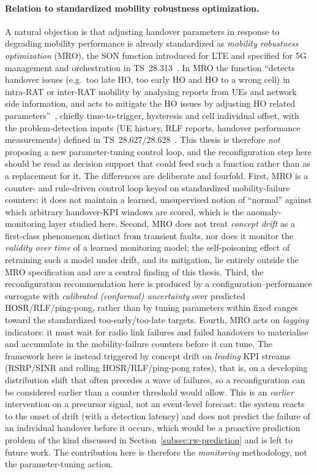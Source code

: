 \paragraph{Relation to standardized mobility robustness optimization.}
A natural objection is that adjusting handover parameters in response to
degrading mobility performance is already standardized as \emph{mobility
robustness optimization} (MRO), the SON function introduced for LTE and
specified for 5G management and orchestration in
TS~28.313~\cite{ts28313}. In MRO the function ``detects handover issues (e.g.\
too late HO, too early HO and HO to a wrong cell) in intra-RAT or inter-RAT
mobility by analysing reports from UEs and network side information, and acts to
mitigate the HO issues by adjusting HO related parameters''~\cite{ts28313},
chiefly time-to-trigger, hysteresis and cell individual offset, with the
problem-detection inputs (UE history, RLF reports, handover performance
measurements) defined in TS~28.627/28.628~\cite{ts28627,ts28628}. This thesis is
therefore \emph{not} proposing a new parameter-tuning control loop, and the
reconfiguration step here should be read as decision support that could feed
such a function rather than as a replacement for it. The differences are
deliberate and fourfold. First, MRO is a counter- and rule-driven control loop
keyed on standardized mobility-failure counters; it does not maintain a learned,
unsupervised notion of ``normal'' against which arbitrary handover-KPI windows
are scored, which is the anomaly-monitoring layer studied here. Second, MRO does
not treat \emph{concept drift} as a first-class phenomenon distinct from
transient faults, nor does it monitor the \emph{validity over time} of a learned
monitoring model; the self-poisoning effect of retraining such a model under
drift, and its mitigation, lie entirely outside the MRO specification and are a
central finding of this thesis. Third, the reconfiguration recommendation here
is produced by a configuration--performance surrogate with \emph{calibrated
(conformal) uncertainty} over predicted HOSR/RLF/ping-pong, rather than by
tuning parameters within fixed ranges toward the standardized too-early/too-late
targets. Fourth, MRO acts on \emph{lagging} indicators: it must wait for radio
link failures and failed handovers to materialise and accumulate in the
mobility-failure counters before it can tune. The framework here is instead
triggered by concept drift on \emph{leading} KPI streams (RSRP/SINR and rolling
HOSR/RLF/ping-pong rates), that is, on a developing distribution shift that often
precedes a wave of failures, so a reconfiguration can be considered earlier than
a counter threshold would allow. This is an \emph{earlier} intervention on a
precursor signal, not an event-level forecast: the system reacts to the onset of
drift (with a detection latency) and does not predict the failure of an
individual handover before it occurs, which would be a proactive
prediction problem of the kind discussed in
Section~\ref{subsec:rw-prediction} and is left to future work. The
contribution here is therefore the \emph{monitoring} methodology, not the
parameter-tuning action.

